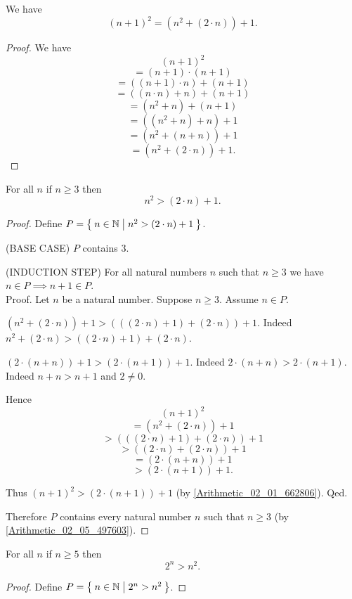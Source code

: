 \documentclass[../../arithmetic.ftl.tex]{subfiles}
\begin{document}
  \begin{forthel}
    \begin{proposition}\label{Arithmetic_02_06_276270}
      We have \[ (n + 1)^{2} = (n^{2} + (2 \cdot n)) + 1. \]
    \end{proposition}
    \begin{proof}
      We have
      \[   (n + 1)^{2} \]
      \[ = (n + 1) \cdot (n + 1) \]
      \[ = ((n + 1) \cdot n) + (n + 1) \]
      \[ = ((n \cdot n) + n) + (n + 1) \]
      \[ = (n^{2} + n) + (n + 1) \]
      \[ = ((n^{2} + n) + n) + 1 \]
      \[ = (n^{2} + (n + n)) + 1 \]
      \[ = (n^{2} + (2 \cdot n)) + 1. \]
    \end{proof}


    \begin{proposition}\label{Arithmetic_02_06_671464}
      For all $n$ if $n \geq 3$ then \[ n^{2} > (2 \cdot n) + 1. \]
    \end{proposition}
    \begin{proof}
      Define $P = \Set{n \in \mathbb{N} | n^{2} > (2 \cdot n) + 1}$.

      (BASE CASE) $P$ contains $3$.

      (INDUCTION STEP) For all natural numbers $n$ such that $n \geq 3$ we have $n \in P \implies n + 1 \in P$. \\
      Proof.
        Let $n$ be a natural number.
        Suppose $n \geq 3$.
        Assume $n \in P$.

        $(n^{2} + (2 \cdot n)) + 1 > (((2 \cdot n) + 1) + (2 \cdot n)) + 1$.
        Indeed $n^{2} + (2 \cdot n) > ((2 \cdot n) + 1) + (2 \cdot n)$.

        $(2 \cdot (n + n)) + 1 > (2 \cdot (n + 1)) + 1$.
        Indeed $2 \cdot (n + n) > 2 \cdot (n + 1)$.
        Indeed $n + n > n + 1$ and $2 \neq 0$.

        Hence
        \[   (n + 1)^{2} \]
        \[ = (n^{2} + (2 \cdot n)) + 1 \]
        \[ > (((2 \cdot n) + 1) + (2 \cdot n)) + 1 \]
        \[ > ((2 \cdot n) + (2 \cdot n)) + 1 \]
        \[ = (2 \cdot (n + n)) + 1 \]
        \[ > (2 \cdot (n + 1)) + 1. \]

        Thus $(n + 1)^{2} > (2 \cdot (n + 1)) + 1$ (by \ref{Arithmetic_02_01_662806}).
      Qed.

      Therefore $P$ contains every natural number $n$ such that $n \geq 3$ (by \ref{Arithmetic_02_05_497603}).
    \end{proof}


    \begin{proposition}\label{Arithmetic_02_06_205395}
      For all $n$ if $n \geq 5$ then \[ 2^{n} > n^{2}. \]
    \end{proposition}
    \begin{proof}
      Define $P = \Set{n \in \mathbb{N} | 2^{n} > n^{2}}$.


\end{proof}
\end{forthel}
\end{document}
